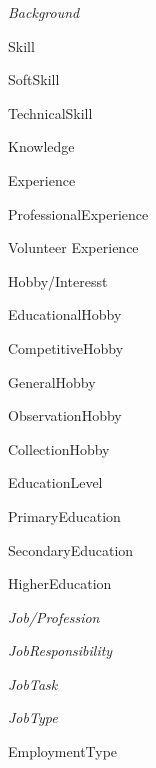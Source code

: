 \documentclass[english]{article}
\begin{document}
\begin{labelist}
    \item   
        \textit{Background}
        \begin{labelist}
            \item Skill
                \begin{labelist}
                    \item SoftSkill
                    \item TechnicalSkill
                \end{labelist}
            \item Knowledge
            \item Experience
                \begin{labelist}
                    \item ProfessionalExperience
                    \item Volunteer Experience
                \end{labelist}
            \item Hobby/Interesst \cite{hobbies_list_ref}
                \begin{labelist}
                    \item EducationalHobby
                    \item CompetitiveHobby
                    \item GeneralHobby
                    \item ObservationHobby
                    \item CollectionHobby
                \end{labelist}
            \item EducationLevel
                \begin{labelist}
                    \item PrimaryEducation
                    \item SecondaryEducation
                    \item HigherEducation
                \end{labelist}
        \end{labelist}
    \item   
        \textit{Job/Profession}
    \item   
        \textit{JobResponsibility}
    \item   
        \textit{JobTask}
    \item 
        \textit{JobType}
        \begin{labelist}
            \item EmploymentType

\end{labelist}
\end{labelist}
\end{document}

